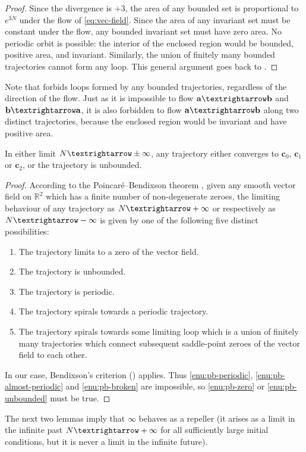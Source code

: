 \begin{proof}
Since the divergence is $+3$, the area of any bounded set is proportional to $e^{3N}$ under the flow of \eqref{eq:vec-field}. Since the area of any invariant set must be constant under the flow, any bounded invariant set must have zero area. No periodic orbit is possible: the interior of the enclosed region would be bounded, positive area, and invariant. Similarly, the union of finitely many bounded trajectories cannot form any loop. This general argument goes back to \cite{bendixson1901}. 
\end{proof}
Note that  forbids loops formed by any bounded trajectories, regardless of the direction of the flow. Just as it is impossible to flow $\mathbf{a}\textrightarrow\mathbf{b}$ and $\mathbf{b}\textrightarrow\mathbf{a}$, it is also forbidden to flow $\mathbf{a}\textrightarrow\mathbf{b}$ along two distinct trajectories, because the enclosed region would be invariant and have positive area. 
\begin{lem}
\label{lem:Poincare-Bendixson} In either limit $N\textrightarrow\pm\infty$, any trajectory either converges to $\mathbf{c}_{0}$, $\mathbf{c}_{1}$ or $\mathbf{c}_{2}$, or the trajectory is unbounded. 
\end{lem}

\begin{proof}
According to the Poincar\'e--Bendixson theorem \cite{bendixson1901}, given any smooth vector field on $\mathbb{R}^{2}$ which has a finite number of non-degenerate zeroes, the limiting behaviour of any trajectory as $N\textrightarrow+\infty$ or respectively as $N\textrightarrow-\infty$ is given by one of the following five distinct possibilities: 
\begin{enumerate}
\item \label{enu:pb-zero}The trajectory limits to a zero of the vector field. 
\item \label{enu:pb-unbounded}The trajectory is unbounded. 
\item \label{enu:pb-periodic}The trajectory is periodic.
\item \label{enu:pb-almost-periodic}The trajectory spirals towards a periodic trajectory.
\item \label{enu:pb-broken}The trajectory spirals towards some limiting loop which is a union of finitely many trajectories which connect subsequent saddle-point zeroes of the vector field to each other. 
\end{enumerate}
In our case, Bendixson's criterion () applies. Thus \ref{enu:pb-periodic}, \ref{enu:pb-almost-periodic} and \ref{enu:pb-broken} are impossible, so \ref{enu:pb-zero} or \ref{enu:pb-unbounded} must be true. 
\end{proof}
The next two lemmas imply that $\bm{\infty}$ behaves as a repeller (it arises as a limit in the infinite past $N\textrightarrow+\infty$ for all sufficiently large initial conditions, but it is never a limit in the infinite future).

